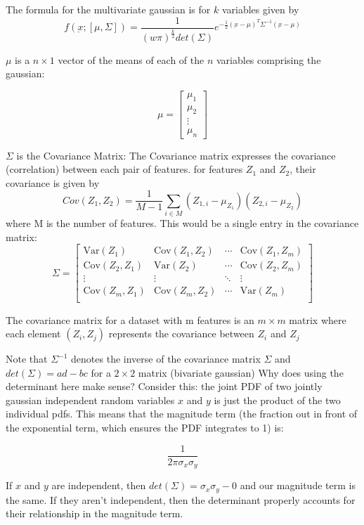 \documentclass[12pt]{article}
\begin{document}
The formula for the multivariate gaussian is for \(k\) variables given by 
\[f(\underbar{x}; [\mu, \Sigma]) = \frac{1}{(w\pi)^{\frac{k}{2}}det(\Sigma)}e^{-\frac{1}{2}(\underbar{x} - \mu)^T \Sigma^{-1}(\underbar{x} - \mu)}\]

\(\mu\) is a \(n \times 1\) vector of the means of each of the \(n\) variables comprising the gaussian:

\[\mu = \left[ \begin{array}{c} \mu_1 \\ \mu_2 \\ \vdots \\ \mu_n \end{array}\right]\]

\(\Sigma\) is the Covariance Matrix:
The Covariance matrix expresses the covariance (correlation) between each pair of features. for features \(Z_1\) and \(Z_2\), their covariance is given by \[Cov(Z_1,Z_2) = \frac{1}{M-1} \sum_{i \in M} (Z_{1,i} - \mu_{Z_1})(Z_{2,i} - \mu_{Z_2})\]
where M is the number of features. This would be a single entry in the covariance matrix:
\[ \Sigma = 
\left[
\begin{array}{cccc}
\text{Var}(Z_1) & \text{Cov}(Z_1, Z_2) & \cdots & \text{Cov}(Z_1, Z_m) \\
\text{Cov}(Z_2, Z_1) & \text{Var}(Z_2) & \cdots & \text{Cov}(Z_2, Z_m) \\
\vdots & \vdots & \ddots & \vdots \\
\text{Cov}(Z_m, Z_1) & \text{Cov}(Z_m, Z_2) & \cdots & \text{Var}(Z_m) \\
\end{array}
\right]
\]

The covariance matrix for a dataset with m features is an \( m \times m \) matrix where each element \((Z_i,Z_j)\) represents the covariance between  \(Z_i\) and \(Z_j\)  

Note that \( \Sigma^{-1}\) denotes the inverse of the covariance matrix \(\Sigma\) and \(det(\Sigma) = ad - bc\) for a \(2 \times 2\) matrix (bivariate gaussian) Why does using the determinant here make sense? Consider this: the joint PDF of two jointly gaussian independent random variables \(x\) and \(y\) is just the product of the two individual pdfs. This means that the magnitude term (the fraction out in front of the exponential term, which ensures the PDF integrates to 1) is:

\[\frac{1}{2\pi \sigma_x \sigma_y}\]

If  \(x\) and \(y\) are independent, then \(det(\Sigma) = \sigma_x \sigma_y - 0\) and our magnitude term is the same. If they aren't independent, then the determinant properly accounts for their relationship in the magnitude term.  
\end{document}
